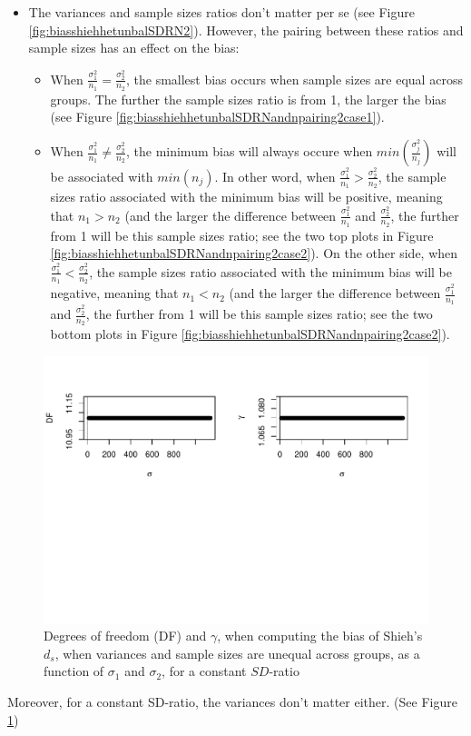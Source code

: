 \documentclass[
  man]{apa6}
\providecommand{\tightlist}{%
  \setlength{\itemsep}{0pt}\setlength{\parskip}{0pt}}
\begin{document}
\begin{itemize}
\tightlist
\item
  The variances and sample sizes ratios don't matter per se (see Figure \ref{fig:biasshiehhetunbalSDRN2}). However, the pairing between these ratios and sample sizes has an effect on the bias:

  \begin{itemize}
  \tightlist
  \item
    When \(\frac{\sigma^2_1}{n_1}=\frac{\sigma^2_2}{n_2}\), the smallest bias occurs when sample sizes are equal across groups. The further the sample sizes ratio is from 1, the larger the bias (see Figure \ref{fig:biasshiehhetunbalSDRNandnpairing2case1}).
  \item
    When \(\frac{\sigma^2_1}{n_1} \neq \frac{\sigma^2_2}{n_2}\), the minimum bias will always occure when \(min(\frac{\sigma^2_j}{n_j})\) will be associated with \(min(n_j)\). In other word, when \(\frac{\sigma^2_1}{n_1}>\frac{\sigma^2_2}{n_2}\), the sample sizes ratio associated with the minimum bias will be positive, meaning that \(n_1>n_2\) (and the larger the difference between \(\frac{\sigma^2_1}{n_1}\) and \(\frac{\sigma^2_2}{n_2}\), the further from 1 will be this sample sizes ratio; see the two top plots in Figure \ref{fig:biasshiehhetunbalSDRNandnpairing2case2}). On the other side, when \(\frac{\sigma^2_1}{n_1}<\frac{\sigma^2_2}{n_2}\), the sample sizes ratio associated with the minimum bias will be negative, meaning that \(n_1<n_2\) (and the larger the difference between \(\frac{\sigma^2_1}{n_1}\) and \(\frac{\sigma^2_2}{n_2}\), the further from 1 will be this sample sizes ratio; see the two bottom plots in Figure \ref{fig:biasshiehhetunbalSDRNandnpairing2case2}).
  \end{itemize}
\end{itemize}

\begin{figure}
\centering
\includegraphics{Theoretical-Bias-of-all-estimators-as-a-function-of-population-parameters_files/figure-latex/biasshiehhetunbalvariance2-1.pdf}
\caption{\label{fig:biasshiehhetunbalvariance2}Degrees of freedom (DF) and \(\gamma\), when computing the bias of Shieh's \(d_s\), when variances and sample sizes are unequal across groups, as a function of \(\sigma_1\) and \(\sigma_2\), for a constant \(SD\)-ratio}
\end{figure}

Moreover, for a constant SD-ratio, the variances don't matter either. (See Figure \ref{fig:biasshiehhetunbalvariance2})
\end{document}

